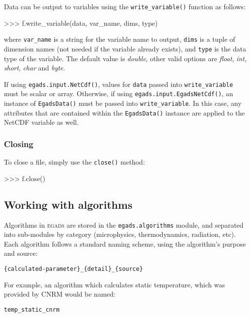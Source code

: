 \documentclass[a4paper,11pt]{report}
\newcommand{\egads}{\textsc{egads} }
\begin{document}
Data can be output to variables using the \verb|write_variable()| function as follows:

\begin{command}
    >>> f.write_variable(data, var_name, dims, type)
\end{command}

where \verb|var_name| is a string for the variable name to output, \verb|dims| is a tuple 
of dimension names (not needed if the variable already exists), and \verb|type| is the 
data type of the variable. The default value is \textit{double}, other valid options 
are \textit{float}, \textit{int}, \textit{short}, \textit{char} and \textit{byte}. 

If using \verb|egads.input.NetCdf()|, values for \verb|data| passed into \verb|write_variable| 
must be scalar or array. Otherwise, if using \verb|egads.input.EgadsNetCdf()|, an instance 
of \verb|EgadsData()| must be passed into \verb|write_variable|. In this case, any attributes 
that are contained within the \verb|EgadsData()| instance are applied to the NetCDF variable as well.

\subsubsection{Closing}

To close a file, simply use the \verb|close()| method:

\begin{command}
    >>> f.close()
\end{command}

\subsection{Working with algorithms}

Algorithms in \egads are stored in the \verb|egads.algorithms| module, and separated into sub-modules
by category (microphysics, thermodynamics, radiation, etc). Each algorithm follows a standard naming 
scheme, using the algorithm's purpose and source:

\begin{verbatim} 
{calculated-parameter}_{detail}_{source}
\end{verbatim}

For example, an algorithm which calculates static temperature, which was provided by CNRM would be
named:

\begin{verbatim}
temp_static_cnrm
\end{verbatim}
\end{document}
